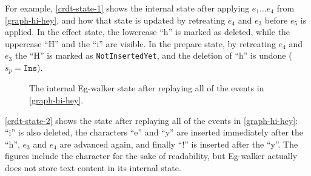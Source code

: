 \documentclass[sigplan,10pt]{acmart}
\newcommand{\algname}{Eg-walker\xspace}
\begin{document}
For example, \autoref{crdt-state-1} shows the internal state after applying $e_1 \dots e_4$ from \autoref{graph-hi-hey}, and how that state is updated by retreating $e_4$ and $e_3$ before $e_5$ is applied.
In the effect state, the lowercase ``h'' is marked as deleted, while the uppercase ``H'' and the ``i'' are visible.
In the prepare state, by retreating $e_4$ and $e_3$ the ``H'' is marked as \texttt{NotInsertedYet}, and the deletion of ``h'' is undone ($s_p = \texttt{Ins}$).

\begin{figure}
  \caption{The internal \algname state after replaying all of the events in \autoref{graph-hi-hey}.}
  \label{crdt-state-2}
\end{figure}

\autoref{crdt-state-2} shows the state after replaying all of the events in \autoref{graph-hi-hey}: ``i'' is also deleted, the characters ``e'' and ``y'' are inserted immediately after the ``h'', $e_3$ and $e_4$ are advanced again, and finally ``!'' is inserted after the ``y''.
The figures include the character for the sake of readability, but \algname actually does not store text content in its internal state.
\end{document}
